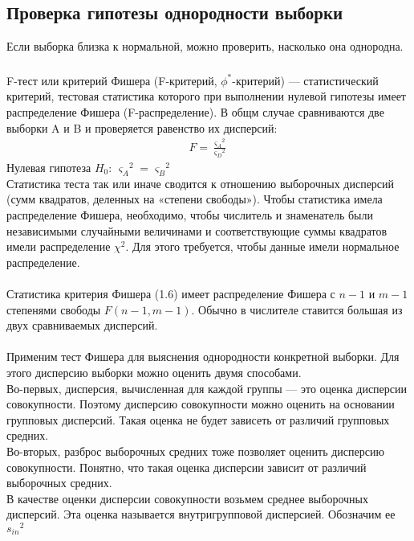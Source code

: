     \subsection{Проверка гипотезы однородности выборки}

    Если выборка близка к нормальной, можно проверить, насколько
она однородна.
    \subsubsection{}

    F-тест или критерий Фишера (F-критерий, $\phi^{*}$-критерий) — статистический критерий, тестовая статистика которого при выполнении нулевой гипотезы имеет распределение Фишера (F-распределение).
В общм случае сравниваются две выборки A и B и проверяется
равенство их дисперсий:
\begin{gather}
    F = \frac{{\varsigma_{A}}^2}{{\varsigma_{D}}^2}
\end{gather}
Нулевая гипотеза $H_0$: ${\varsigma_{A}}^2 = {\varsigma_{B}}^2$\\
Статистика теста так или иначе сводится к отношению выборочных
дисперсий (сумм квадратов, деленных на «степени свободы»). Чтобы статистика имела распределение Фишера, необходимо, чтобы числитель и знаменатель были независимыми случайными величинами и соответствующие суммы квадратов имели распределение $\chi^2$. Для этого требуется, чтобы данные имели нормальное распределение. \\ \\
Статистика критерия Фишера (1.6) имеет распределение Фишера с $n-1$ и $m-1$ степенями свободы $F(n-1,m-1)$. Обычно в числителе ставится большая из двух сравниваемых дисперсий. \\ \\ 
Применим тест Фишера для выяснения однородности конкретной выборки. Для этого дисперсию выборки можно оценить двумя способами.\\
Во-первых, дисперсия, вычисленная для каждой группы — это оценка дисперсии совокупности. Поэтому дисперсию совокупности можно оценить на основании групповых дисперсий. Такая оценка не будет зависеть от различий групповых средних.\\
Во-вторых, разброс выборочных средних тоже позволяет оценить дисперсию совокупности. Понятно, что такая оценка дисперсии зависит от различий выборочных средних.\\
В качестве оценки дисперсии совокупности возьмем среднее выборочных дисперсий. Эта оценка называется внутригрупповой дисперсией. Обозначим ее ${s_{in}}^2$
